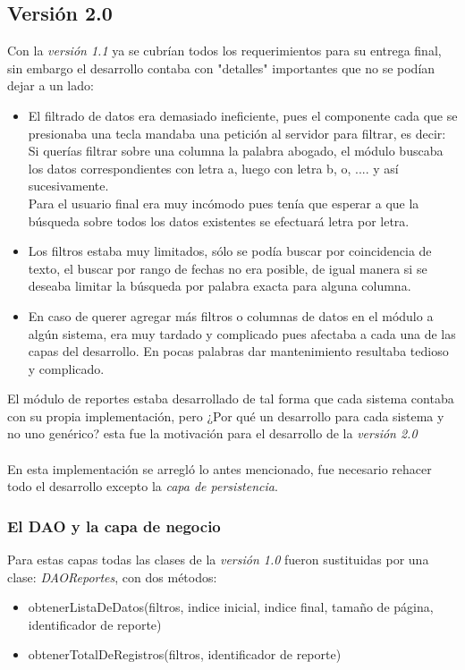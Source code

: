 \documentclass[../reportesINE.tex]{subfiles}
\begin{document}
\subsection{Versión 2.0}
Con la \textit{versión 1.1} ya se cubrían todos los requerimientos para su entrega final, sin embargo el desarrollo contaba con "detalles" importantes que no se podían dejar a un lado: 
\begin{itemize}
\item El filtrado de datos era demasiado ineficiente, pues el componente cada que se presionaba una tecla mandaba una petición al servidor para filtrar, es decir: Si querías filtrar sobre una columna la palabra abogado, el módulo buscaba los datos correspondientes con letra a, luego con letra b, o, .... y así sucesivamente. \\ Para el usuario final era muy incómodo pues tenía que esperar a que la búsqueda sobre todos los datos existentes se efectuará letra por letra. 
\item Los filtros estaba muy limitados, sólo se podía buscar por coincidencia de texto, el buscar por rango de fechas no era posible, de igual manera si se deseaba limitar la búsqueda por palabra exacta para alguna columna. 
\item En caso de querer agregar más filtros o columnas de datos en el módulo a algún sistema, era muy tardado y complicado pues afectaba a cada una de las capas del desarrollo. En pocas palabras dar mantenimiento resultaba tedioso y complicado. 
\end{itemize}
El módulo de reportes estaba desarrollado de tal forma que cada sistema contaba con su propia implementación, pero ¿Por qué un desarrollo para cada sistema y no uno genérico? esta fue la motivación para el desarrollo de la \textit{versión 2.0}   \\ \\
En esta implementación se arregló lo antes mencionado, fue necesario rehacer todo el desarrollo excepto la \textit{capa de persistencia}. 

\subsubsection{El DAO y la capa de negocio}
Para estas capas todas las clases de la \textit{versión 1.0} fueron sustituidas por una clase: \textit{DAOReportes}, con dos métodos: 

\begin{itemize}
\item obtenerListaDeDatos(filtros, indice inicial, indice final, tamaño de página, identificador de reporte)
\item obtenerTotalDeRegistros(filtros, identificador de reporte)
\end{itemize}
\end{document}
